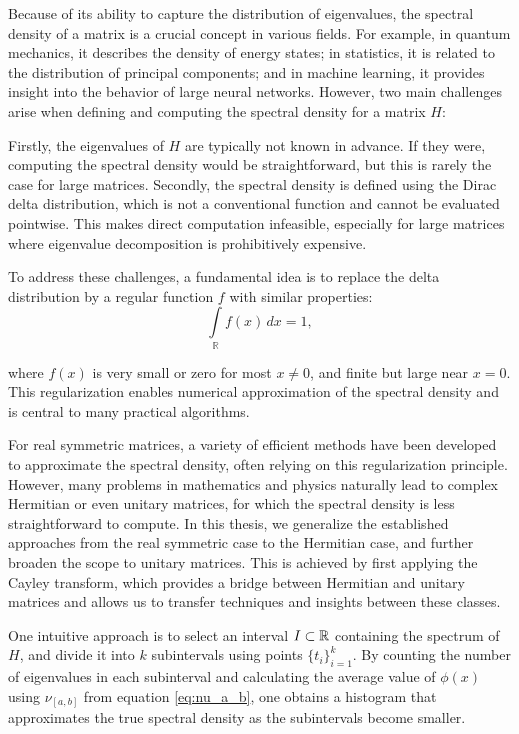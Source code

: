 Because of its ability to capture the distribution of eigenvalues, the spectral density of a matrix is a crucial concept in various fields. For example, in quantum mechanics, it describes the density of energy states; in statistics, it is related to the distribution of principal components; and in machine learning, it provides insight into the behavior of large neural networks. However, two main challenges arise when defining and computing the spectral density for a matrix $H$:

Firstly, the eigenvalues of $H$ are typically not known in advance. If they were, computing the spectral density would be straightforward, but this is rarely the case for large matrices. Secondly, the spectral density is defined using the Dirac delta distribution, which is not a conventional function and cannot be evaluated pointwise. This makes direct computation infeasible, especially for large matrices where eigenvalue decomposition is prohibitively expensive.

To address these challenges, a fundamental idea is to replace the delta distribution by a regular function $f$ with similar properties:
\begin{equation} \label{integral_equals_one}
    \int\limits_{\mathbb{R}} f(x)\, dx = 1,
\end{equation}

where $f(x)$ is very small or zero for most $x \neq 0$, and finite but large near $x = 0$. This regularization enables numerical approximation of the spectral density and is central to many practical algorithms.

For real symmetric matrices, a variety of efficient methods have been developed to approximate the spectral density,
often relying on this regularization principle.
However, many problems in mathematics and physics naturally lead to complex Hermitian or even unitary matrices,
for which the spectral density is less straightforward to compute.
In this thesis, we generalize the established approaches from the real symmetric case to the Hermitian case,
and further broaden the scope to unitary matrices.
This is achieved by first applying the Cayley transform, which provides a bridge between Hermitian and unitary matrices
and allows us to transfer techniques and insights between these classes.

One intuitive approach is to select an interval $I \subset \mathbb{R}$ containing the spectrum of $H$,
and divide it into $k$ subintervals using points $\{t_i\}_{i=1}^k$.
By counting the number of eigenvalues in each subinterval
and calculating the average value of $\phi(x)$ using $\nu_{[a, b]}$ from equation \ref{eq:nu_a_b},
one obtains a histogram that approximates the true spectral density as the subintervals become smaller.

